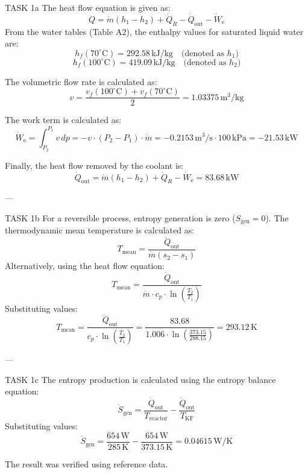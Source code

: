 TASK 1a  
The heat flow equation is given as:  
\[
Q = \dot{m} (h_1 - h_2) + \dot{Q}_R - \dot{Q}_{\text{out}} - \dot{W}_{\text{e}}
\]  
From the water tables (Table A2), the enthalpy values for saturated liquid water are:  
\[
h_f(70^\circ\text{C}) = 292.58 \, \text{kJ/kg} \quad \text{(denoted as } h_1\text{)}
\]  
\[
h_f(100^\circ\text{C}) = 419.09 \, \text{kJ/kg} \quad \text{(denoted as } h_2\text{)}
\]  

The volumetric flow rate is calculated as:  
\[
v = \frac{v_f(100^\circ\text{C}) + v_f(70^\circ\text{C})}{2} = 1.03375 \, \text{m}^3/\text{kg}
\]  

The work term is calculated as:  
\[
\dot{W}_{\text{e}} = \int_{P_2}^{P_1} v \, dp = -v \cdot (P_2 - P_1) \cdot \dot{m} = -0.2153 \, \text{m}^3/\text{s} \cdot 100 \, \text{kPa} = -21.53 \, \text{kW}
\]  

Finally, the heat flow removed by the coolant is:  
\[
\dot{Q}_{\text{out}} = \dot{m} (h_1 - h_2) + \dot{Q}_R - \dot{W}_{\text{e}} = 83.68 \, \text{kW}
\]  

---

TASK 1b  
For a reversible process, entropy generation is zero (\( S_{\text{gen}} = 0 \)). The thermodynamic mean temperature is calculated as:  
\[
T_{\text{mean}} = \frac{\dot{Q}_{\text{out}}}{\dot{m} (s_2 - s_1)}  
\]  
Alternatively, using the heat flow equation:  
\[
T_{\text{mean}} = \frac{\dot{Q}_{\text{out}}}{\dot{m} \cdot c_p \cdot \ln\left(\frac{T_2}{T_1}\right)}  
\]  
Substituting values:  
\[
T_{\text{mean}} = \frac{\dot{Q}_{\text{out}}}{c_p \cdot \ln\left(\frac{T_2}{T_1}\right)} = \frac{83.68}{1.006 \cdot \ln\left(\frac{373.15}{288.15}\right)} = 293.12 \, \text{K}
\]  

---

TASK 1c  
The entropy production is calculated using the entropy balance equation:  
\[
\dot{S}_{\text{gen}} = \frac{\dot{Q}_{\text{out}}}{T_{\text{reactor}}} - \frac{\dot{Q}_{\text{out}}}{T_{\text{KF}}}  
\]  
Substituting values:  
\[
\dot{S}_{\text{gen}} = \frac{654 \, \text{W}}{285 \, \text{K}} - \frac{654 \, \text{W}}{373.15 \, \text{K}} = 0.04615 \, \text{W/K}
\]  

The result was verified using reference data.